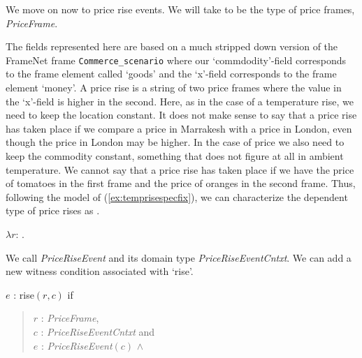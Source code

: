 We move on
now to price rise events.  We will take \nexteg{} to be the type of
price frames, \textit{PriceFrame}.
\begin{ex} 
\end{ex} 
The fields represented here are based on a much stripped down version
of the FrameNet frame \texttt{Commerce\_scenario} where our
`commdodity'-field corresponds to the frame element called `goods' and
the `x'-field corresponds to the frame element `money'. A price rise
is a string of two price frames where the value in the `x'-field is
higher in the second.  Here, as in the case of a temperature rise, we need to keep
the location constant.  It does not make sense to say that a price
rise has taken place if we compare a price in Marrakesh with a price
in London, even though the price in London may be higher.  In the case
of price we also need to keep the commodity constant, something that
does not figure at all in ambient temperature.  We cannot say that a
price rise has taken place if we have the price of tomatoes in the
first frame and the price of oranges in the second frame.  Thus,
following the model of (\ref{ex:temprisespecfix}), we can characterize
the dependent type of price rises as \nexteg{}.
\begin{ex} 
$\lambda
r$: .\\  
\hspace*{2em}  
    \end{ex}
We call \preveg{} \textit{PriceRiseEvent} and its domain type
\textit{PriceRiseEventCntxt}.  We can add a new witness condition
associated with `rise'.
\begin{ex} 
  $e$ : rise$(r,c)$ if
  \begin{quote}
    $r$ : \textit{PriceFrame},\\
    $c$ : \textit{PriceRiseEventCntxt} and \\
    $e$ : \textit{PriceRiseEvent}$(c)$ \d{$\wedge$}
  \end{quote}

\end{ex}

